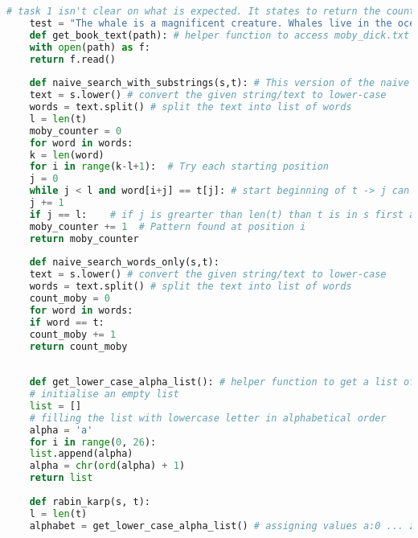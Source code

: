 \begin{lstlisting}[language=Python]
	# task 1 isn't clear on what is expected. It states to return the count of the word "whale" but speficies substring search algorithmns to do so. 
	test = "The whale is a magnificent creature. Whales live in the ocean. A blue whale can grow very large. The swordwhale is not a real animal. Whalers used to hunt whales. The whalebone was valuable. Whalewhalewhale is not a word, but whale-watching is a popular activity. Whale appears in this sentence. Is whale capitalized here?"
	def get_book_text(path): # helper function to access moby_dick.txt 
	with open(path) as f:
	return f.read()
	
	def naive_search_with_substrings(s,t): # This version of the naive search is not fit for searching an entire book due to the O(n^2) time-complexity.
	text = s.lower() # convert the given string/text to lower-case
	words = text.split() # split the text into list of words 
	l = len(t)    
	moby_counter = 0
	for word in words:
	k = len(word)
	for i in range(k-l+1):  # Try each starting position
	j = 0
	while j < l and word[i+j] == t[j]: # start beginning of t -> j can be greater the len(t) check all positions of the given suffix from s if it contains t.
	j += 1
	if j == l:    # if j is grearter than len(t) than t is in s first at index i.
	moby_counter += 1  # Pattern found at position i
	return moby_counter
	
	def naive_search_words_only(s,t):
	text = s.lower() # convert the given string/text to lower-case
	words = text.split() # split the text into list of words 
	count_moby = 0
	for word in words:
	if word == t:
	count_moby += 1
	return count_moby
	
	
	def get_lower_case_alpha_list(): # helper function to get a list of the latin alphabet
	# initialise an empty list
	list = []
	# filling the list with lowercase letter in alphabetical order
	alpha = 'a'
	for i in range(0, 26):
	list.append(alpha)
	alpha = chr(ord(alpha) + 1)
	return list
	
	def rabin_karp(s, t):
	l = len(t)
	alphabet = get_lower_case_alpha_list() # assigning values a:0 ... z = 25
	

\end{lstlisting}
